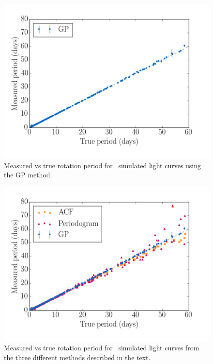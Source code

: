 
\begin{figure}
\begin{center}
\includegraphics[width=6in, clip=true]{figures/compare_gp.pdf}
\caption[GP results.]
{Measured vs true rotation period for \nlightcurves\ simulated light
curves using the GP method.}
\end{center}
\end{figure}
\label{fig:GP_compare_noise_free}

\begin{figure}
\begin{center}
\includegraphics[width=6in, clip=true]{figures/compare2.pdf}
\caption[All results.]
{Measured vs true rotation period for \nlightcurves\ simulated light
curves from the three different methods described in the text.}
\end{center}
\end{figure}
\label{fig:compare_noise_free}

